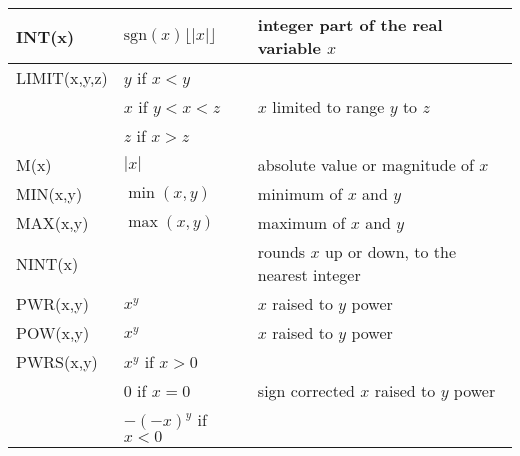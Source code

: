 {\begin{longtable}{>{\raggedright\small}m{1in}>{\raggedright\small}m{2in}>{\raggedright\let\\\tabularnewline\small}m{2in}}
    INT(x) & $\mathrm{sgn}(x)\lfloor |x|\rfloor$ & integer part of the real 
    variable $x$  \\ \hline

    LIMIT(x,y,z)
    & $y$ if $x < y$ & \\
    & $x$ if $y < x < z$  & $x$ limited to range $y$ to $z$ \\
    & $z$ if $x > z$ & \\ \hline
    
    
    M(x) & $|x|$ & absolute value or magnitude of $x$ \\ \hline

    MIN(x,y) & $\min(x,y)$ & minimum of $x$ and $y$  \\ \hline

    MAX(x,y) & $\max(x,y)$ & maximum of $x$ and $y$  \\ \hline

    NINT(x) &            & rounds $x$ up or down, to the nearest integer  \\ \hline

    PWR(x,y) & $x^{y}$ & $x$ raised to $y$ power  \\ \hline
    POW(x,y) & $x^{y}$ & $x$ raised to $y$ power  \\ \hline
    PWRS(x,y)
    & $x^{y}$ if $x > 0$ & \\
    & 0 if $x = 0$ & sign corrected $x$ raised to $y$ power  \\
    & $-(-x)^{y}$ if $x < 0$ & \\ \hline


\end{longtable}}
